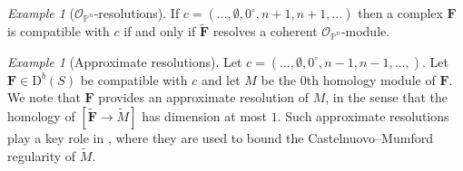 \documentclass[12pt]{amsart}
\theoremstyle{definition}
\theoremstyle{remark}
\newtheorem{example}[lemma]{Example}
\newcommand{\PP}{\mathbb{P}}
\newcommand{\cc}{c}
\newcommand{\cO}{\mathcal{O}}
\newcommand{\FF}{\mathbf{F}}
\newcommand{\zp}{\circ}
\newcommand{\nothing}{\emptyset}
\newcommand{\DD}{\mathrm{D}}
\begin{document}
\begin{example}[$\cO_{\PP^n}$-resolutions]\label{ex:sheaf resolutions}
If $\cc=(\dots,\nothing,0^{\zp},n+1,n+1,\dots)$ then a complex $\FF$ is compatible with $\cc$ if and only if $\widetilde{\FF}$ resolves a coherent $\cO_{\PP^n}$-module.
\end{example}


\begin{example}[Approximate resolutions]
Let $\cc=(\dots,\nothing,0^\zp,n-1,n-1,\dots,)$.   Let $\FF\in \DD^b(S)$ be compatible with $\cc$ and let $M$ be the $0$th homology module of $\FF$.  We note that $\FF$ provides an approximate resolution of $M$, in the sense that the homology of $[\widetilde{\FF}\to \widetilde{M}]$ has dimension at most $1$.  Such approximate resolutions play a key role in \cite[Lemma~1.6]{gruson-lazarsfeld-peskine}, where they are used to bound the Castelnuovo--Mumford regularity of $\widetilde{M}$.
\end{example}
\end{document}
